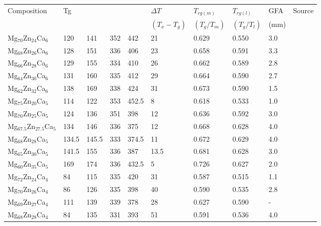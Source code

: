 \documentclass[a4paper,12pt,oneside]{report}%
\begin{document}
\begin{table}[h]
	\centering
	\begin{tabular}{ l l l l l l l l l l }
		\toprule
		Composition & \acrshort{Tg} & \Tx & \Tm & \Tl & $\Delta T$ & $T_{rg(m)}$ & $T_{rg(l)}$ & GFA & Source \\ 
		& & & & & $(T_{x} - T_{g})$ & $(T_{g}/T_{m})$ & $(T_{g}/T_{l})$ & (mm) & \\ 
		\midrule
		Mg$_{70}$Zn$_{24}$Ca$_{6}$ & 120 & 141 & 352 & 442 & 21 & 0.629 & 0.550 & 3.0 & \cite{Cao2013, Cao2012} \\ 
		Mg$_{68}$Zn$_{26}$Ca$_{6}$ & 128 & 151 & 336 & 406 & 23 & 0.658 & 0.591 & 3.3 & \cite{Cao2013, Cao2012} \\ 
		Mg$_{66}$Zn$_{28}$Ca$_{6}$ & 129 & 155 & 334 & 410 & 26 & 0.662 & 0.589 & 2.8 & \cite{Cao2013, Cao2012} \\ 
		Mg$_{64}$Zn$_{30}$Ca$_{6}$ & 131 & 160 & 335 & 412 & 29 & 0.664 & 0.590 & 2.7 & \cite{Cao2013, Cao2012} \\ 
		Mg$_{62}$Zn$_{32}$Ca$_{6}$ & 138 & 169 & 338 & 424 & 31 & 0.673 & 0.590 & 1.5 & \cite{Cao2013, Cao2012} \\ 
		Mg$_{75}$Zn$_{20}$Ca$_{5}$ & 114 & 122 & 353 & 452.5 & 8 & 0.618 & 0.533 & 1.0 & \cite{Gu2005} \\ 
		Mg$_{70}$Zn$_{25}$Ca$_{5}$ & 124 & 136 & 351 & 398 & 12 & 0.636 & 0.592 & 3.0 & \cite{Gu2005, Zhou2013} \\ 
		Mg$_{67.5}$Zn$_{27.5}$Ca$_{5}$ & 134 & 146 & 336 & 375 & 12 & 0.668 & 0.628 & 4.0 & \cite{Gu2005} \\ 
		Mg$_{68}$Zn$_{28}$Ca$_{5}$ & 134.5 & 145.5 & 333 & 374.5 & 11 & 0.672 & 0.629 & 4.0 & \cite{Gu2005} \\ 
		Mg$_{65}$Zn$_{30}$Ca$_{5}$ & 141.5 & 155 & 336 & 387 & 13.5 & 0.681 & 0.628 & 3.0 & \cite{Gu2005} \\ 
		Mg$_{60}$Zn$_{35}$Ca$_{5}$ & 169 & 174 & 336 & 432.5 & 5 & 0.726 & 0.627 & 2.0 & \cite{Gu2005} \\ 
		Mg$_{72}$Zn$_{24}$Ca$_{4}$ & 84 & 115 & 335 & 420 & 31 & 0.587 & 0.515 & 1.1 & \cite{Cao2013, Cao2012} \\ 
		Mg$_{70}$Zn$_{26}$Ca$_{4}$ & 86 & 126 & 335 & 398 & 40 & 0.590 & 0.535 & 2.8 & \cite{Cao2013, Cao2012} \\ 
		Mg$_{69}$Zn$_{27}$Ca$_{4}$ & 111 & 139 & 339 & 378 & 28 & 0.627 & 0.590 & - & \cite{Wang2013} \\ 
		Mg$_{68}$Zn$_{28}$Ca$_{4}$ & 84 & 135 & 331 & 393 & 51 & 0.591 & 0.536 & 4.0 & \cite{Cao2013, Cao2012} \\ 

\end{tabular}
\end{table}
\end{document}
